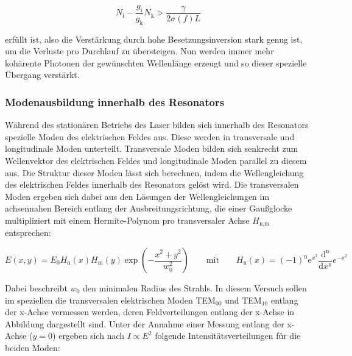             \begin{equation*}
                N_{\text{i}} - \frac{g_{\text{i}}}{g_{\text{k}}}N_{\text{k}} > \frac{\gamma}{2\sigma (f) L}
                \label{eqn:Schwellwertbedingung}
            \end{equation*}

            erfüllt ist, also die Verstärkung durch hohe Besetzungsinversion stark genug ist, um die Verluste pro Durchlauf zu übersteigen. Nun werden immer mehr kohärente Photonen der gewünschten Wellenlänge 
            erzeugt und so dieser spezielle Übergang verstärkt.


        \subsubsection{Modenausbildung innerhalb des Resonators}
            Während des stationären Betriebs des Laser bilden sich innerhalb des Resonators spezielle Moden des elektrischen Feldes aus. Diese werden in transversale und longitudinale Moden unterteilt. 
            Transversale Moden bilden sich senkrecht zum Wellenvektor des elektrischen Feldes und longitudinale Moden parallel zu diesem aus. Die Struktur dieser Moden lässt sich berechnen, indem die 
            Wellengleichung des elektrischen Feldes innerhalb des Resonators gelöst wird. \newline
            Die transversalen Moden ergeben sich dabei aus den Lösungen der Wellengleichungen im achsennahen Bereich entlang der Ausbreitungsrichtung, die einer Gaußglocke multipliziert mit einem 
            Hermite-Polynom pro transversaler Achse $H_{\text{n,m}}$ entsprechen:

            \begin{equation*}
                E(x,y) = E_0 H_{\text{n}}(x) H_{\text{m}}(y) \exp \left(-\frac{x^2+y^2}{w_0^2}\right) \qquad \text{mit} \qquad H_{\text{n}}(x) = (-1)^{\text{n}} \text{e}^{x^2} \frac{\text{d}^{\text{n}}}{\text{d}x^{\text{n}}} e^{-x^2} 
            \end{equation*}

            Dabei beschreibt $w_0$ den minimalen Radius des Strahls.
            In diesem Versuch sollen im speziellen die transversalen elektrischen Moden TEM$_{00}$ und TEM$_{10}$ entlang der x-Achse vermessen werden, deren Feldverteilungen entlang der x-Achse in Abbildung 
            dargestellt sind. Unter der Annahme einer Messung entlang der x-Achse ($y=0$) ergeben sich nach $I \propto E^2$ folgende Intensitätsverteilungen für die beiden Moden: 
            


